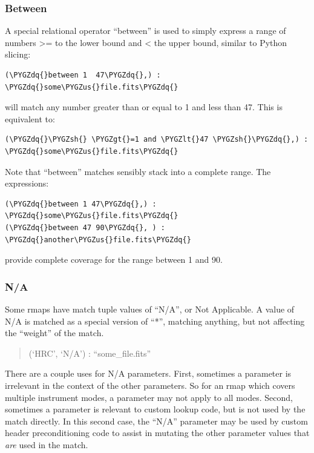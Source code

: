\documentclass[letterpaper,10pt,english]{sphinxmanual}
\def\PYGZus{\char`\_}
\def\PYGZlt{\char`\<}
\def\PYGZgt{\char`\>}
\def\PYGZsh{\char`\#}
\def\PYGZdq{\char`\"}
\begin{document}
\subsubsection{Between}
\label{rmap_syntax:between}
A special relational operator ``between'' is used to simply express a range
of numbers \textgreater{}= to the lower bound and \textless{} the upper bound,  similar to Python
slicing:

\begin{Verbatim}[commandchars=\\\{\}]
(\PYGZdq{}between 1  47\PYGZdq{},) : \PYGZdq{}some\PYGZus{}file.fits\PYGZdq{}
\end{Verbatim}

will match any number greater than or equal to 1 and less than 47.   This is
equivalent to:

\begin{Verbatim}[commandchars=\\\{\}]
(\PYGZdq{}\PYGZsh{} \PYGZgt{}=1 and \PYGZlt{}47 \PYGZsh{}\PYGZdq{},) : \PYGZdq{}some\PYGZus{}file.fits\PYGZdq{}
\end{Verbatim}

Note that ``between'' matches sensibly stack into a complete range.  The expressions:

\begin{Verbatim}[commandchars=\\\{\}]
(\PYGZdq{}between 1 47\PYGZdq{},) : \PYGZdq{}some\PYGZus{}file.fits\PYGZdq{}
(\PYGZdq{}between 47 90\PYGZdq{}, ) : \PYGZdq{}another\PYGZus{}file.fits\PYGZdq{}
\end{Verbatim}

provide complete coverage for the range between 1 and 90.


\subsubsection{N/A}
\label{rmap_syntax:n-a}
Some rmaps have match tuple values of ``N/A'',  or Not Applicable.
A value of N/A is matched as a special version of ``*'', matching anything,  but
not affecting the ``weight'' of the match.
\begin{quote}

(`HRC', `N/A') :  ``some\_file.fits''
\end{quote}

There are a couple uses for N/A parameters.    First,  sometimes a parameter is
irrelevant in the context of the other parameters.   So for an rmap which covers
multiple instrument modes,  a parameter may not apply to all modes. Second,
sometimes a parameter is relevant to custom lookup code,  but is not used by the
match directly.  In this second case,   the ``N/A'' parameter may be used by custom
header preconditioning code to assist in mutating the other parameter values
that \emph{are} used in the match.
\end{document}
